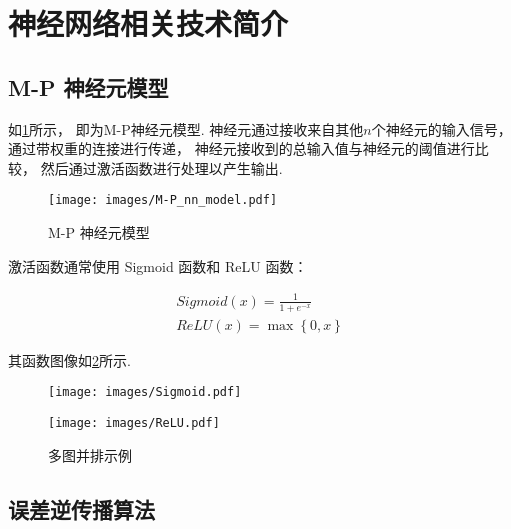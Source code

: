 \section{神经网络相关技术简介}

\subsection{M-P 神经元模型}

如\cref{fig:M-P}所示，
即为M-P神经元模型.
神经元通过接收来自其他$n$个神经元的输入信号，
通过带权重的连接进行传递，
神经元接收到的总输入值与神经元的阈值进行比较，
然后通过激活函数进行处理以产生输出\cite{zhouJiQiXueXi}.

\begin{figure}[!h]
    \centering
    \texttt{[image: images/M-P\_nn\_model.pdf]}
    \caption{M-P 神经元模型}\label{fig:M-P}
\end{figure}

激活函数通常使用 Sigmoid 函数和 ReLU 函数：

\begin{equation}
    \label{eq:sigmoid}
    \begin{aligned}
        Sigmoid\left(x\right) = \frac{1}{1+e^{-x}} \\
        ReLU\left(x\right) = \max\left\{0, x\right\}
    \end{aligned}
\end{equation}

其函数图像如\cref{fig:active-func}所示.

\begin{figure}
    \centering
    \begin{minipage}[c]{0.45\textwidth}
        \centering
        \texttt{[image: images/Sigmoid.pdf]}
        \label{fig:sigmoid}
    \end{minipage}
    \begin{minipage}[c]{0.45\textwidth}
        \centering
        \texttt{[image: images/ReLU.pdf]}
        \label{fig:ReLu}
    \end{minipage}
    \caption{多图并排示例}
    \label{fig:active-func}
\end{figure}

\subsection{误差逆传播算法}

